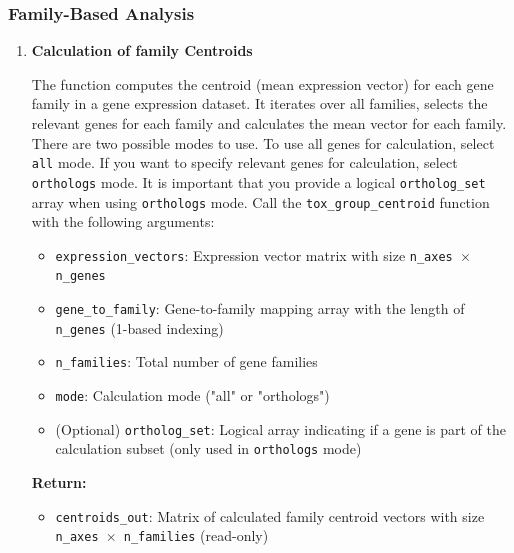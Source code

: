 \documentclass[11pt]{article}
\begin{document}
\subsubsection{Family-Based Analysis}
\begin{enumerate}
	\item \textbf{Calculation of family Centroids}
	      
	      The function computes the centroid (mean expression vector) for each gene family
	      in a gene expression dataset. It iterates over all families, selects the relevant
	      genes for each family and calculates the mean vector for each family.
	      There are two possible modes to use. To use all genes for calculation,
	      select \texttt{all} mode. If you want to specify relevant genes for
	      calculation, select \texttt{orthologs} mode. It is important that you provide
	      a logical \texttt{ortholog\_set} array when using \texttt{orthologs} mode.
	      Call the \texttt{tox\_group\_centroid} function with the following arguments:
	      
	      \begin{itemize}
	      	\item \texttt{expression\_vectors}: Expression vector matrix with size \texttt{n\_axes
	      	      $\times$ n\_genes}
	      	
	      	\item \texttt{gene\_to\_family}: Gene-to-family mapping array with the length
	      	      of \texttt{n\_genes} (1-based indexing)
	      	      
	      	\item \texttt{n\_families}: Total number of gene families
	      	      
	      	\item \texttt{mode}: Calculation mode ("all" or "orthologs")
	      	      
	      	\item (Optional) \texttt{ortholog\_set}: Logical array indicating if a gene
	      	      is part of the calculation subset (only used in \texttt{orthologs} mode)
	      \end{itemize}
	      
	      \textbf{Return:}
	      \begin{itemize}
	      	\item \texttt{centroids\_out}: Matrix of calculated family centroid vectors
	      	      with size \texttt{n\_axes $\times$ n\_families} (read-only)
	      \end{itemize}
	      

\end{enumerate}
\end{document}
